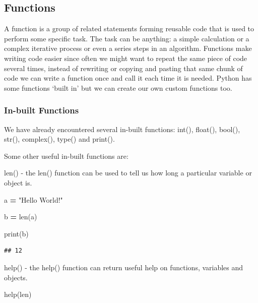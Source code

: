 \documentclass[
]{book}
\newenvironment{Shaded}{\begin{snugshade}}{\end{snugshade}}
\newcommand{\BuiltInTok}[1]{#1}
\newcommand{\NormalTok}[1]{#1}
\newcommand{\OperatorTok}[1]{\textcolor[rgb]{0.81,0.36,0.00}{\textbf{#1}}}
\newcommand{\StringTok}[1]{\textcolor[rgb]{0.31,0.60,0.02}{#1}}
\begin{document}
\hypertarget{functions}{%
\subsection{Functions}\label{functions}}

A function is a group of related statements forming reusable code that is used to perform some specific task. The task can be anything: a simple calculation or a complex iterative process or even a series steps in an algorithm. Functions make writing code easier since often we might want to repeat the same piece of code several times, instead of rewriting or copying and pasting that same chunk of code we can write a function once and call it each time it is needed. Python has some functions `built in' but we can create our own custom functions too.

\hypertarget{in-built-functions}{%
\subsubsection{In-built Functions}\label{in-built-functions}}

We have already encountered several in-built functions: int(), float(), bool(), str(), complex(), type() and print().

Some other useful in-built functions are:

len() - the len() function can be used to tell us how long a particular variable or object is.

\begin{Shaded}
\begin{Highlighting}[]
\NormalTok{a }\OperatorTok{=} \StringTok{"Hello World!"}

\NormalTok{b }\OperatorTok{=} \BuiltInTok{len}\NormalTok{(a)}

\BuiltInTok{print}\NormalTok{(b)}
\end{Highlighting}
\end{Shaded}

\begin{verbatim}
## 12
\end{verbatim}

help() - the help() function can return useful help on functions, variables and objects.

\begin{Shaded}
\begin{Highlighting}[]

\BuiltInTok{help}\NormalTok{(}\BuiltInTok{len}\NormalTok{)}
\end{Highlighting}
\end{Shaded}
\end{document}
